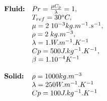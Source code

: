 \documentclass[10pt, hyperref={unicode=true,pdfusetitle, bookmarks=true,bookmarksnumbered=false,bookmarksopen=false, breaklinks=false,pdfborder={0 0 1},backref=true,colorlinks=true,linkcolor=darkblue,pageanchor}]{beamer}
\begin{document}
\begin{frame}
\begin{block}{}
\begin{columns}[c]
$$
\begin{array}{ll}
\mbox{\textbf{Fluid:}}      & Pr=\frac{\mu C_p}{\lambda}=1, \\
                            & T_{ref}=30^o C,\\
                            & \mu=2 \; 10^{-3} kg.m^{-1}.s^{-1},\\
                            & \rho=2 \; kg.m^{-3},\\
                            & \lambda=1. W.m^{-1}.K^{-1} \\
                            & Cp=500 J.kg^{-1}.K^{-1},\\
                            & \beta=1.10^{-4} K^{-1} \\
                            &  \\
\mbox{\textbf{Solid:}}      & \rho=1000 kg.m^{-3} \\
                            & \lambda=250 W.m^{-1}.K^{-1} \\
                            & Cp=100 J.kg^{-1}.K^{-1}
\end{array}
$$

\end{columns}

\end{block}
\end{frame}
\end{document}
